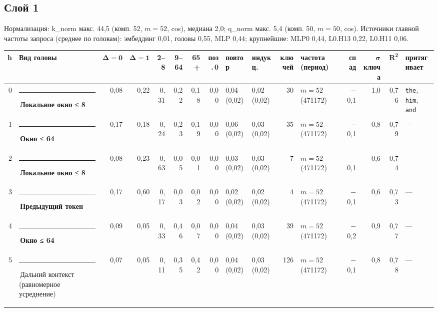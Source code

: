 \documentclass[10pt]{article}
\begin{document}
\noindent\begin{minipage}{\linewidth}
\subsection*{Слой 1}
{\small\color{ink2} Нормализация: k\_norm макс. 44,5 (комп. 52, $m{=}52$, cos), медиана 2,0; q\_norm макс. 5,4 (комп. 50, $m{=}50$, cos). Источники главной частоты запроса (среднее по головам): эмбеддинг 0,01, головы 0,55, MLP 0,44; крупнейшие: MLP0 0,44, L0.H13 0,22, L0.H11 0,06.}
\begin{center}{\footnotesize\begin{tabular}{|r|l|r|r|r|r|r|r|l|l|r|l|r|r|r|l|}
\hline
\rowcolor{head}\textbf{h} & \textbf{Вид головы} & $\boldsymbol{\Delta{=}0}$ & $\boldsymbol{\Delta{=}1}$ & \textbf{2–8} & \textbf{9–64} & \textbf{65+} & \textbf{поз.\,0} & \textbf{повтор} & \textbf{индукц.} & \textbf{ключей} & \textbf{частота (период)} & \textbf{спад} & $\boldsymbol{\sigma}$ \textbf{ключа} & $\boldsymbol{R^2}$ & \textbf{притягивает} \\ \hline
0 & \textcolor[HTML]{1BAF7A}{\rule{0.62em}{0.62em}}\,\textbf{Локальное окно ≤ 8} & 0,08 & 0,22 & 0,31 & 0,22 & 0,18 & 0,00 & 0,04 (0,02) & 0,02 (0,02) & 30 & $m{=}52$ (471172) & $-$0,1 & 1,0 & 0,76 & \texttt{\textvisiblespace{}the}, \texttt{\textvisiblespace{}him}, \texttt{\textvisiblespace{}and} \\ \hline
1 & \textcolor[HTML]{EDA100}{\rule{0.62em}{0.62em}}\,\textbf{Окно ≤ 64} & 0,17 & 0,18 & 0,24 & 0,23 & 0,19 & 0,00 & 0,06 (0,02) & 0,03 (0,02) & 35 & $m{=}52$ (471172) & $-$0,1 & 0,8 & 0,79 & — \\ \hline
2 & \textcolor[HTML]{1BAF7A}{\rule{0.62em}{0.62em}}\,\textbf{Локальное окно ≤ 8} & 0,08 & 0,23 & 0,63 & 0,05 & 0,01 & 0,00 & 0,03 (0,02) & 0,03 (0,02) & 7 & $m{=}52$ (471172) & $-$0,1 & 0,6 & 0,74 & — \\ \hline
3 & \textcolor[HTML]{2A78D6}{\rule{0.62em}{0.62em}}\,\textbf{Предыдущий токен} & 0,17 & 0,60 & 0,17 & 0,03 & 0,02 & 0,00 & 0,02 (0,02) & 0,02 (0,02) & 4 & $m{=}52$ (471172) & $-$0,1 & 0,6 & 0,73 & — \\ \hline
4 & \textcolor[HTML]{EDA100}{\rule{0.62em}{0.62em}}\,\textbf{Окно ≤ 64} & 0,09 & 0,05 & 0,33 & 0,46 & 0,07 & 0,00 & 0,04 (0,02) & 0,03 (0,02) & 39 & $m{=}52$ (471172) & $-$0,2 & 0,9 & 0,77 & — \\ \hline
5 & \textcolor[HTML]{C3C2B7}{\rule{0.62em}{0.62em}}\,Дальний контекст (равномерное усреднение) & 0,07 & 0,05 & 0,11 & 0,35 & 0,42 & 0,00 & 0,04 (0,02) & 0,03 (0,02) & 126 & $m{=}52$ (471172) & $-$0,1 & 0,8 & 0,78 & — \\ \hline

\end{tabular}}
\end{center}
\end{minipage}
\end{document}

